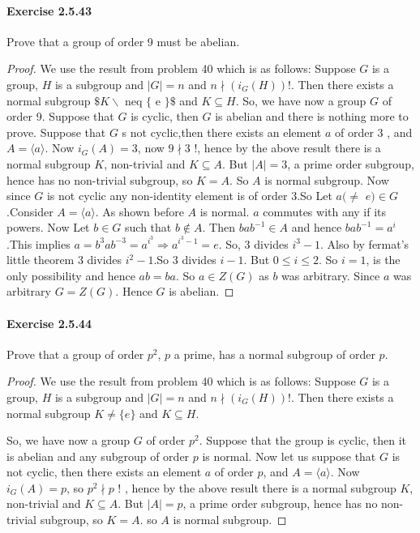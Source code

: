 \documentclass{article}
\begin{document}
\paragraph{Exercise 2.5.43} Prove that a group of order 9 must be abelian.
\begin{proof}
    We use the result from problem 40 which is as follows: Suppose $G$ is a group, $H$ is a subgroup and $|G|=n$ and $n \nmid\left(i_G(H)\right) !$. Then there exists a normal subgroup $\$ K \backslash$ neq $\{$ e $\} \$$ and $K \subseteq H$.
So, we have now a group $G$ of order 9. Suppose that $G$ is cyclic, then $G$ is abelian and there is nothing more to prove. Suppose that $G$ s not cyclic,then there exists an element $a$ of order 3 , and $A=\langle a\rangle$. Now $i_G(A)=3$, now $9 \nmid 3$ !, hence by the above result there is a normal subgroup $K$, non-trivial and $K \subseteq A$. But $|A|=3$, a prime order subgroup, hence has no non-trivial subgroup, so $K=A$. So $A$ is normal subgroup. Now since $G$ is not cyclic any non-identity element is of order 3.So Let $a(\neq$ $e) \in G$.Consider $A=\langle a\rangle$. As shown before $A$ is normal. $a$ commutes with any if its powers. Now Let $b \in G$ such that $b \notin A$. Then $b a b^{-1} \in A$ and hence $b a b^{-1}=a^i$.This implies $a=b^3 a b^{-3}=a^{i^3} \Longrightarrow a^{i^3-1}=e$. So, 3 divides $i^3-1$. Also by fermat's little theorem 3 divides $i^2-1$.So 3 divides $i-1$. But $0 \leq i \leq 2$. So $i=1$, is the only possibility and hence $a b=b a$. So $a \in Z(G)$ as $b$ was arbitrary. Since $a$ was arbitrary $G=Z(G)$. Hence $G$ is abelian.
\end{proof}



\paragraph{Exercise 2.5.44} Prove that a group of order $p^2$, $p$ a prime, has a normal subgroup of order $p$.
\begin{proof}
    We use the result from problem 40 which is as follows: Suppose $G$ is a group, $H$ is a subgroup and $|G|=n$ and $n \nmid\left(i_G(H)\right) !$. Then there exists a normal subgroup $K \neq \{ e \}$ and $K \subseteq H$.

So, we have now a group $G$ of order $p^2$. Suppose that the group is cyclic, then it is abelian and any subgroup of order $p$ is normal. Now let us suppose that $G$ is not cyclic, then there exists an element $a$ of order $p$, and $A=\langle a\rangle$. Now $i_G(A)=p$, so $p^2 \nmid p$ ! , hence by the above result there is a normal subgroup $K$, non-trivial and $K \subseteq A$. But $|A|=p$, a prime order subgroup, hence has no non-trivial subgroup, so $K=A$. so $A$ is normal subgroup.
\end{proof}
\end{document}
